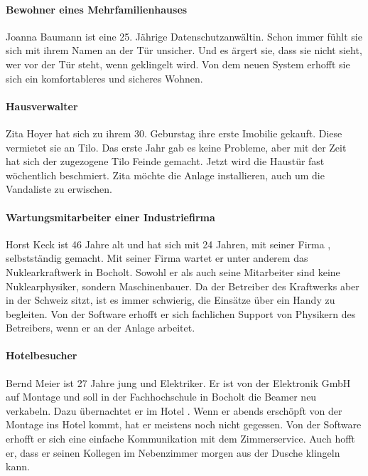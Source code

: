 \paragraph{\large{Bewohner eines Mehrfamilienhauses}}
    Joanna Baumann ist eine 25. Jährige Datenschutzanwältin.
    Schon immer fühlt sie sich mit ihrem Namen an der Tür unsicher.
    Und es ärgert sie, dass sie nicht sieht, wer vor der Tür steht, wenn geklingelt wird.
    Von dem neuen System erhofft sie sich ein komfortableres und sicheres Wohnen.


\paragraph{\large{Hausverwalter}}
    Zita Hoyer hat sich zu ihrem 30. Geburstag ihre erste Imobilie gekauft.
    Diese vermietet sie an Tilo.
    Das erste Jahr gab es keine Probleme, aber mit der Zeit hat sich der zugezogene Tilo Feinde gemacht.
    Jetzt wird die Haustür fast wöchentlich beschmiert.
    Zita möchte die Anlage installieren, auch um die Vandaliste zu erwischen.


\paragraph{\large{Wartungsmitarbeiter einer Industriefirma}}
    Horst Keck ist 46 Jahre alt und hat sich mit 24 Jahren, mit seiner Firma , selbstständig gemacht.
    Mit seiner Firma wartet er unter anderem das Nuklearkraftwerk  in Bocholt.
    Sowohl er als auch seine Mitarbeiter sind keine Nuklearphysiker, sondern Maschinenbauer.
    Da der Betreiber des Kraftwerks aber in der Schweiz sitzt, ist es immer schwierig, die Einsätze über ein Handy zu begleiten.
    Von der Software erhofft er sich fachlichen Support von Physikern des Betreibers, wenn er an der Anlage arbeitet.


\paragraph{\large{Hotelbesucher}}
    Bernd Meier ist 27 Jahre jung und Elektriker.
    Er ist von der Elektronik GmbH auf Montage und soll in der Fachhochschule in Bocholt die Beamer neu verkabeln.
    Dazu übernachtet er im Hotel .
    Wenn er abends erschöpft von der Montage ins Hotel kommt, hat er meistens noch nicht gegessen.
    Von der Software erhofft er sich eine einfache Kommunikation mit dem Zimmerservice.
    Auch hofft er, dass er seinen Kollegen im Nebenzimmer morgen aus der Dusche klingeln kann.
